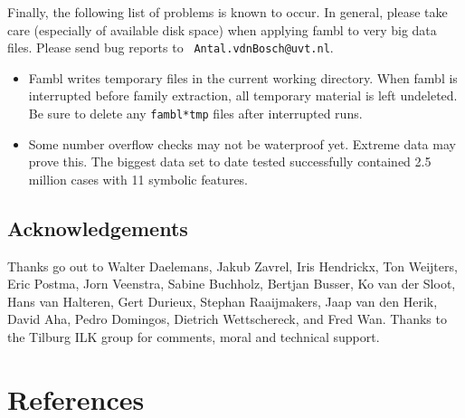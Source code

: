 \documentclass[11pt]{article}
\begin{document}
Finally, the following list of problems is known to occur. In general,
please take care (especially of available disk space) when applying
{\sc fambl} to very big data files. Please send bug reports to  {\tt
Antal.vdnBosch@uvt.nl}.

\begin{itemize}
\item
{\sc Fambl} writes temporary files in the current working directory. When
{\sc fambl} is interrupted before family extraction, all temporary material
is left undeleted. Be sure to delete any {\tt fambl*tmp} files after
interrupted runs.
\item
Some number overflow checks may not be waterproof yet. Extreme data may
prove this. The biggest data set to date tested successfully contained
2.5 million cases with 11 symbolic features.
\end{itemize}

\subsection*{Acknowledgements}

Thanks go out to Walter Daelemans, Jakub Zavrel, Iris Hendrickx, Ton
Weijters, Eric Postma, Jorn Veenstra, Sabine Buchholz, Bertjan Busser,
Ko van der Sloot, Hans van Halteren, Gert Durieux, Stephan
Raaijmakers, Jaap van den Herik, David Aha, Pedro Domingos, Dietrich
Wettschereck, and Fred Wan. Thanks to the Tilburg ILK group for
comments, moral and technical support.

\section*{References}
\label{refs}
\end{document}
